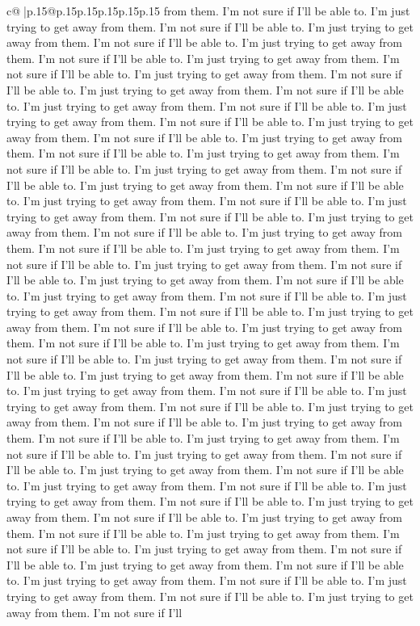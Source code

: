 \documentclass{article}
\begin{document}
{\begin{supertabular}{c@{$\;$}|p{.15\linewidth}@{}p{.15\linewidth}p{.15\linewidth}p{.15\linewidth}p{.15\linewidth}p{.15\linewidth}}
{{{from them. I'm not sure if I'll be able to. I'm just trying to get away from them. I'm not sure if I'll be able to. I'm just trying to get away from them. I'm not sure if I'll be able to. I'm just trying to get away from them. I'm not sure if I'll be able to. I'm just trying to get away from them. I'm not sure if I'll be able to. I'm just trying to get away from them. I'm not sure if I'll be able to. I'm just trying to get away from them. I'm not sure if I'll be able to. I'm just trying to get away from them. I'm not sure if I'll be able to. I'm just trying to get away from them. I'm not sure if I'll be able to. I'm just trying to get away from them. I'm not sure if I'll be able to. I'm just trying to get away from them. I'm not sure if I'll be able to. I'm just trying to get away from them. I'm not sure if I'll be able to. I'm just trying to get away from them. I'm not sure if I'll be able to. I'm just trying to get away from them. I'm not sure if I'll be able to. I'm just trying to get away from them. I'm not sure if I'll be able to. I'm just trying to get away from them. I'm not sure if I'll be able to. I'm just trying to get away from them. I'm not sure if I'll be able to. I'm just trying to get away from them. I'm not sure if I'll be able to. I'm just trying to get away from them. I'm not sure if I'll be able to. I'm just trying to get away from them. I'm not sure if I'll be able to. I'm just trying to get away from them. I'm not sure if I'll be able to. I'm just trying to get away from them. I'm not sure if I'll be able to. I'm just trying to get away from them. I'm not sure if I'll be able to. I'm just trying to get away from them. I'm not sure if I'll be able to. I'm just trying to get away from them. I'm not sure if I'll be able to. I'm just trying to get away from them. I'm not sure if I'll be able to. I'm just trying to get away from them. I'm not sure if I'll be able to. I'm just trying to get away from them. I'm not sure if I'll be able to. I'm just trying to get away from them. I'm not sure if I'll be able to. I'm just trying to get away from them. I'm not sure if I'll be able to. I'm just trying to get away from them. I'm not sure if I'll be able to. I'm just trying to get away from them. I'm not sure if I'll be able to. I'm just trying to get away from them. I'm not sure if I'll be able to. I'm just trying to get away from them. I'm not sure if I'll be able to. I'm just trying to get away from them. I'm not sure if I'll be able to. I'm just trying to get away from them. I'm not sure if I'll be able to. I'm just trying to get away from them. I'm not sure if I'll be able to. I'm just trying to get away from them. I'm not sure if I'll be able to. I'm just trying to get away from them. I'm not sure if I'll be able to. I'm just trying to get away from them. I'm not sure if I'll be able to. I'm just trying to get away from them. I'm not sure if I'll be able to. I'm just trying to get away from them. I'm not sure if I'll be able to. I'm just trying to get away from them. I'm not sure if I'll be able to. I'm just trying to get away from them. I'm not sure if I'll be able to. I'm just trying to get away from them. I'm not sure if I'll }}}
\end{supertabular}}
\end{document}
